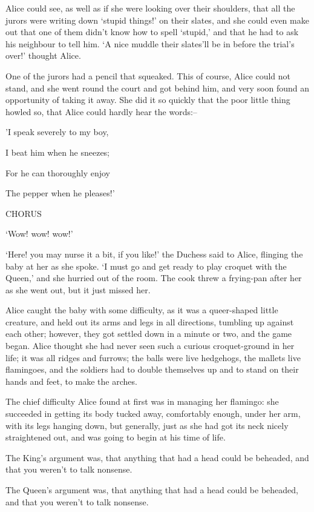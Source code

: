 \documentclass[statementpaper,twoside,openany]{memoir}
\begin{document}
Alice could see, as well as if she were looking over their shoulders, that all the jurors were writing down `stupid things!' on their slates, and she could even make out that one of them didn't know how to spell `stupid,' and that he had to ask his neighbour to tell him. `A nice muddle their slates'll be in before the trial's over!' thought Alice.

One of the jurors had a pencil that squeaked. This of course, Alice could not stand, and she went round the court and got behind him, and very soon found an opportunity of taking it away. She did it so quickly that the poor little thing howled so, that Alice could hardly hear the words:--

'I speak severely to my boy,

I beat him when he sneezes;

For he can thoroughly enjoy

The pepper when he pleases!'

CHORUS

`Wow! wow! wow!'

`Here! you may nurse it a bit, if you like!' the Duchess said to Alice, flinging the baby at her as she spoke. `I must go and get ready to play croquet with the Queen,' and she hurried out of the room. The cook threw a frying-pan after her as she went out, but it just missed her.

Alice caught the baby with some difficulty, as it was a queer-shaped little creature, and held out its arms and legs in all directions, tumbling up against each other; however, they got settled down in a minute or two, and the game began. Alice thought she had never seen such a curious croquet-ground in her life; it was all ridges and furrows; the balls were live hedgehogs, the mallets live flamingoes, and the soldiers had to double themselves up and to stand on their hands and feet, to make the arches.

The chief difficulty Alice found at first was in managing her flamingo: she succeeded in getting its body tucked away, comfortably enough, under her arm, with its legs hanging down, but generally, just as she had got its neck nicely straightened out, and was going to begin at his time of life.

The King's argument was, that anything that had a head could be beheaded, and that you weren't to talk nonsense.

The Queen's argument was, that anything that had a head could be beheaded, and that you weren't to talk nonsense.
\end{document}
